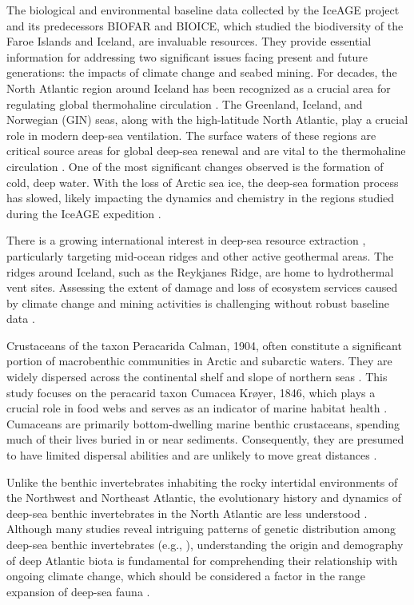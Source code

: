 The biological and environmental baseline data collected by the IceAGE project and its predecessors BIOFAR and BIOICE, which studied the biodiversity of the Faroe Islands and Iceland, are invaluable resources. They provide essential information for addressing two significant issues facing present and future generations: the impacts of climate change and seabed mining. For decades, the North Atlantic region around Iceland has been recognized as a crucial area for regulating global thermohaline circulation \citep{meisner_prefacebiodiversity_2018}. The Greenland, Iceland, and Norwegian (GIN) seas, along with the high-latitude North Atlantic, play a crucial role in modern deep-sea ventilation. The surface waters of these regions are critical source areas for global deep-sea renewal and are vital to the thermohaline circulation \citep{johannessen_relationship_1994}. One of the most significant changes observed is the formation of cold, deep water. With the loss of Arctic sea ice, the deep-sea formation process has slowed, likely impacting the dynamics and chemistry in the regions studied during the IceAGE expedition \citep{meisner_prefacebiodiversity_2018}.

There is a growing international interest in deep-sea resource extraction \citep{mengerink_call_2014}, particularly targeting mid-ocean ridges and other active geothermal areas. The ridges around Iceland, such as the Reykjanes Ridge, are home to hydrothermal vent sites. Assessing the extent of damage and loss of ecosystem services caused by climate change and mining activities is challenging without robust baseline data \citep{meisner_prefacebiodiversity_2018}.

Crustaceans of the taxon Peracarida Calman, 1904, often constitute a significant portion of macrobenthic communities in Arctic and subarctic waters. They are widely dispersed across the continental shelf and slope of northern seas \citep{stransky_diversity_2010}. This study focuses on the peracarid taxon Cumacea Krøyer, 1846, which plays a crucial role in food webs and serves as an indicator of marine habitat health \citep{stransky_diversity_2010}. Cumaceans are primarily bottom-dwelling marine benthic crustaceans, spending much of their lives buried in or near sediments. Consequently, they are presumed to have limited dispersal abilities and are unlikely to move great distances \citep{uhlir_adding_2021}.

Unlike the benthic invertebrates inhabiting the rocky intertidal environments of the Northwest and Northeast Atlantic, the evolutionary history and dynamics of deep-sea benthic invertebrates in the North Atlantic are less understood \citep{jennings_phylogeographic_2014}. Although many studies reveal intriguing patterns of genetic distribution among deep-sea benthic invertebrates (e.g., \citep{wilson_historical_1998, havermans_genetic_2013}), understanding the origin and demography of deep Atlantic biota is fundamental for comprehending their relationship with ongoing climate change, which should be considered a factor in the range expansion of deep-sea fauna \citep{jennings_phylogeographic_2014}.

